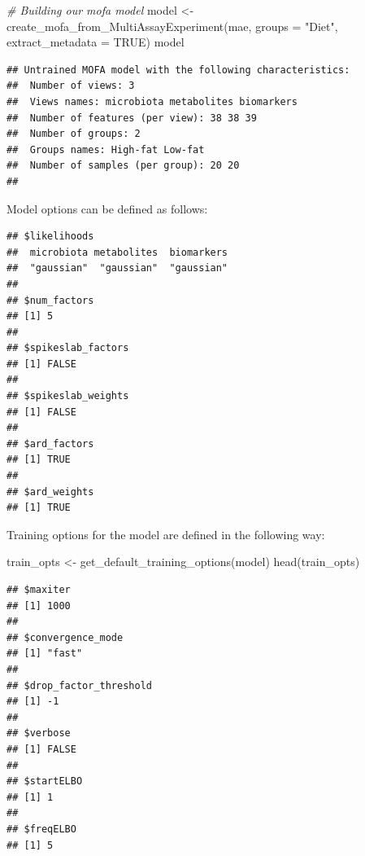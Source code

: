\documentclass[
]{book}
\newenvironment{Shaded}{\begin{snugshade}}{\end{snugshade}}
\newcommand{\AttributeTok}[1]{\textcolor[rgb]{0.77,0.63,0.00}{#1}}
\newcommand{\CommentTok}[1]{\textcolor[rgb]{0.56,0.35,0.01}{\textit{#1}}}
\newcommand{\ConstantTok}[1]{\textcolor[rgb]{0.00,0.00,0.00}{#1}}
\newcommand{\DecValTok}[1]{\textcolor[rgb]{0.00,0.00,0.81}{#1}}
\newcommand{\FunctionTok}[1]{\textcolor[rgb]{0.00,0.00,0.00}{#1}}
\newcommand{\NormalTok}[1]{#1}
\newcommand{\OtherTok}[1]{\textcolor[rgb]{0.56,0.35,0.01}{#1}}
\newcommand{\SpecialCharTok}[1]{\textcolor[rgb]{0.00,0.00,0.00}{#1}}
\newcommand{\StringTok}[1]{\textcolor[rgb]{0.31,0.60,0.02}{#1}}
\begin{document}
\begin{Shaded}
\begin{Highlighting}[]
\CommentTok{\# Building our mofa model}
\NormalTok{model }\OtherTok{\textless{}{-}} \FunctionTok{create\_mofa\_from\_MultiAssayExperiment}\NormalTok{(mae,}
                                               \AttributeTok{groups =} \StringTok{"Diet"}\NormalTok{, }
                                               \AttributeTok{extract\_metadata =} \ConstantTok{TRUE}\NormalTok{)}
\NormalTok{model}
\end{Highlighting}
\end{Shaded}

\begin{verbatim}
## Untrained MOFA model with the following characteristics: 
##  Number of views: 3 
##  Views names: microbiota metabolites biomarkers 
##  Number of features (per view): 38 38 39 
##  Number of groups: 2 
##  Groups names: High-fat Low-fat 
##  Number of samples (per group): 20 20 
## 
\end{verbatim}

Model options can be defined as follows:

\begin{Shaded}
\end{Shaded}

\begin{verbatim}
## $likelihoods
##  microbiota metabolites  biomarkers 
##  "gaussian"  "gaussian"  "gaussian" 
## 
## $num_factors
## [1] 5
## 
## $spikeslab_factors
## [1] FALSE
## 
## $spikeslab_weights
## [1] FALSE
## 
## $ard_factors
## [1] TRUE
## 
## $ard_weights
## [1] TRUE
\end{verbatim}

Training options for the model are defined in the following way:

\begin{Shaded}
\begin{Highlighting}[]
\NormalTok{train\_opts }\OtherTok{\textless{}{-}} \FunctionTok{get\_default\_training\_options}\NormalTok{(model)}
\FunctionTok{head}\NormalTok{(train\_opts)}
\end{Highlighting}
\end{Shaded}

\begin{verbatim}
## $maxiter
## [1] 1000
## 
## $convergence_mode
## [1] "fast"
## 
## $drop_factor_threshold
## [1] -1
## 
## $verbose
## [1] FALSE
## 
## $startELBO
## [1] 1
## 
## $freqELBO
## [1] 5
\end{verbatim}
\end{document}
